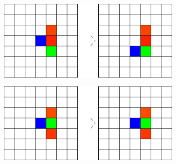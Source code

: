 \begin{figure}[H]\ContinuedFloat
        \begin{subfigure}[T]{0.45\textwidth}
            \centering
            \includegraphics[width=\textwidth]{playground/5.png}
            \label{fig:playground_5}
        \end{subfigure}
        \hfill
        \begin{subfigure}[T]{0.45\textwidth}
            \centering
            \includegraphics[width=\textwidth]{playground/6.png}
            \label{fig:playground_6}
        \end{subfigure}
\end{figure}

